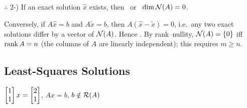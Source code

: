 \begin{keybox}
$\therefore$ 2-) If an exact solution $\hat x$ exists, then  \ or \ $\dim\mathcal{N}(A) = 0$.
\end{keybox}
\begin{insight}
Conversely, if $A\hat x = b$ and $A\tilde x = b$, then $A(\hat x-\tilde x) = 0$, i.e.\ any two exact solutions
differ by a vector of $\mathcal{N}(A)$. Hence . By rank--nullity, $\mathcal{N}(A)=\{0\}$ iff $\operatorname{rank} A = n$ (the columns of $A$ are
linearly independent); this requires $m\ge n$.
\end{insight}

\subsection{Least-Squares Solutions}\label{ss:least-squares}
\point $\displaystyle \begin{bmatrix}1\\1\end{bmatrix}x = \begin{bmatrix}2\\1\end{bmatrix}$, \qquad $Ax = b$, \qquad $b\notin\mathcal{R}(A)$

